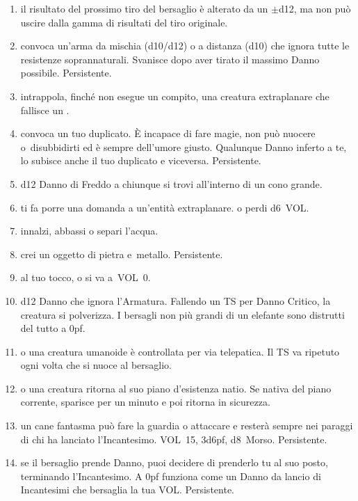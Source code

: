 \documentclass[itdr]{subfiles}
\begin{document}
\begin{enumerate}
	\item {} il risultato del prossimo tiro del bersaglio è alterato da un $\pm$d12, ma non può uscire dalla gamma di risultati del tiro originale.
	\item {} convoca un'arma da mischia (d10/d12) o a distanza (d10) che ignora tutte le resistenze soprannaturali. Svanisce dopo aver tirato il massimo Danno possibile. Persistente.
	\item {} intrappola, finché non esegue un compito, una creatura extraplanare che fallisce un .
	\item {} convoca un tuo duplicato. È incapace di fare magie, non può nuocere o~disubbidirti ed è sempre dell'umore giusto. Qualunque Danno inferto a te, lo subisce anche il tuo duplicato e viceversa. \mbox{Persistente}.
	\item {} d12 Danno di Freddo a chiunque si trovi all'interno di un cono grande.
	\item {} ti fa porre una domanda a un'entità extraplanare.  o perdi d6~VOL.
	\item {} innalzi, abbassi o separi l'acqua.
	\item {} crei un oggetto di pietra e~metallo. Persistente.
	\item {} al tuo tocco,  o si va a~VOL~0.
	\item {} d12 Danno che ignora l'Armatura. Fallendo un TS per Danno Critico, la creatura si polverizza. I bersagli non più grandi di un elefante sono distrutti del tutto a 0pf.
	\item {}  o una creatura umanoide è controllata per via telepatica. Il TS va ripetuto ogni volta che si nuoce al bersaglio.
	\item {}  o una creatura ritorna al suo piano d'esistenza natio. Se nativa del piano corrente, sparisce per un minuto e poi ritorna in sicurezza.
	\item {} un cane fantasma può fare la guardia o attaccare e resterà sempre nei paraggi di chi ha lanciato l'Incantesimo. VOL~15, 3d6pf, d8~Morso. Persistente.
	\item {} se il bersaglio prende Danno, puoi decidere di prenderlo tu al suo posto, terminando l'Incantesimo. A 0pf funziona come un Danno da lancio di Incantesimi che bersaglia la tua VOL. Persistente.

\end{enumerate}
\end{document}
